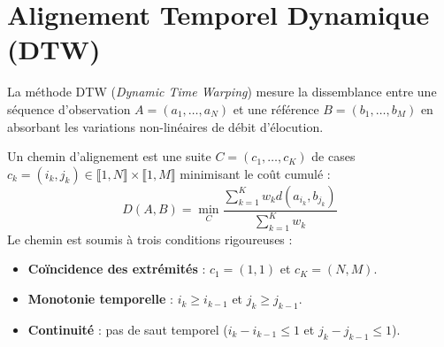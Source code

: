 
\section{Alignement Temporel Dynamique (DTW)}

La méthode DTW (\emph{Dynamic Time Warping}) mesure la dissemblance entre une séquence d'observation $A = (a_1, \dots, a_N)$ et une référence $B = (b_1, \dots, b_M)$ en absorbant les variations non-linéaires de débit d'élocution.

\begin{definition}
    Un chemin d'alignement est une suite $C = (c_1, \dots, c_K)$ de cases $c_k = (i_k, j_k) \in \llbracket 1, N \rrbracket \times \llbracket 1, M \rrbracket$ minimisant le coût cumulé :
    \begin{equation}
        D(A,B) = \min_C \frac{\sum_{k=1}^K w_k d(a_{i_k}, b_{j_k})}{\sum_{k=1}^K w_k}
    \end{equation}
    Le chemin est soumis à trois conditions rigoureuses :
    \begin{itemize}
        \item \textbf{Coïncidence des extrémités} : $c_1 = (1,1)$ et $c_K = (N,M)$.
        \item \textbf{Monotonie temporelle} : $i_k \geqslant i_{k-1}$ et $j_k \geqslant j_{k-1}$.
        \item \textbf{Continuité} : pas de saut temporel ($i_k - i_{k-1} \leqslant 1$ et $j_k - j_{k-1} \leqslant 1$).
    \end{itemize}
\end{definition}

